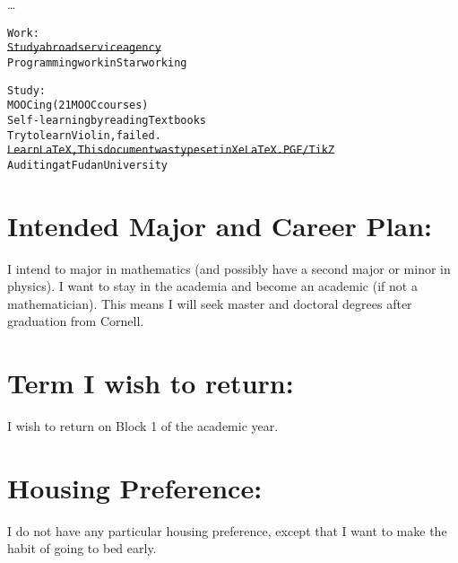 	\dots
	
	\begin{alltt}
	Work:
	\st{Study abroad service agency}
	Programming work in Starworking
	
	Study:
	MOOCing (21 MOOC courses)
	Self-learning by reading Textbooks
	Try to learn Violin, failed.
	\st{Learn LaTeX, This document was typeset in XeLaTeX. PGF/TikZ}
	Auditing at Fudan University
	\end{alltt}
	
	\section*{Intended Major and Career Plan:}
	I intend to major in mathematics (and possibly have a second major or minor in physics). I want to stay in the academia and become an academic (if not a mathematician). This means I will seek master and doctoral degrees after graduation from Cornell.
	
	\section*{Term I wish to return:}
	I wish to return on Block 1 of the  academic year.
	
	\section*{Housing Preference:}
	I do not have any particular housing preference, except that I want to make the habit of going to bed early.
	
	\pagebreak \nocite{COA8e,CSAPP}
	
	\printbibliography
